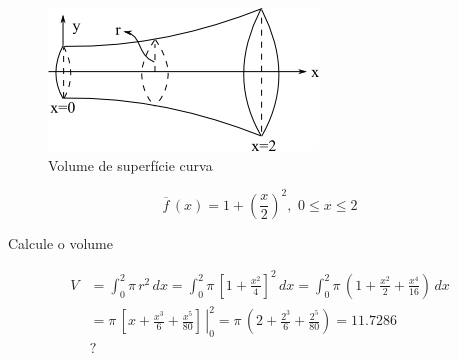\begin{example}

\begin{figure}[htb]
 \centering
 \includegraphics[scale=1.0]{capitulos/capitulo2/figuras/regra_trapezio3.png}
 \caption{Volume de superfície curva}
 \label{fig:regra_trapezio2}
\end{figure}

\[
 \overline{f}\,(x) = 1 + \left( \frac{x}{2} \right)^2, \, \, 0 \leq x \leq 2
\]

Calcule o volume

\[
 \begin{array}{ll}
  V & = \displaystyle \int_0^2 \pi \, r^2 \, dx = \int_0^2 \pi \, \left[ 1 + \frac{x^2}{4} \right]^2 \, dx = \int_0^2 \pi \, \left( 1 + \frac{x^2}{2} + \frac{x^4}{16} \right) \, dx \\
    & = \left. \pi \, \left[ x + \displaystyle \frac{x^3}{6} + \frac{x^5}{80} \right] \displaystyle \, \right|_0^2 = \pi \, \left(2 + \displaystyle \frac{2^3}{6} + \frac{2^5}{80}\right) = 11.7286 \\
    & ?
 \end{array}
\]

\end{example}